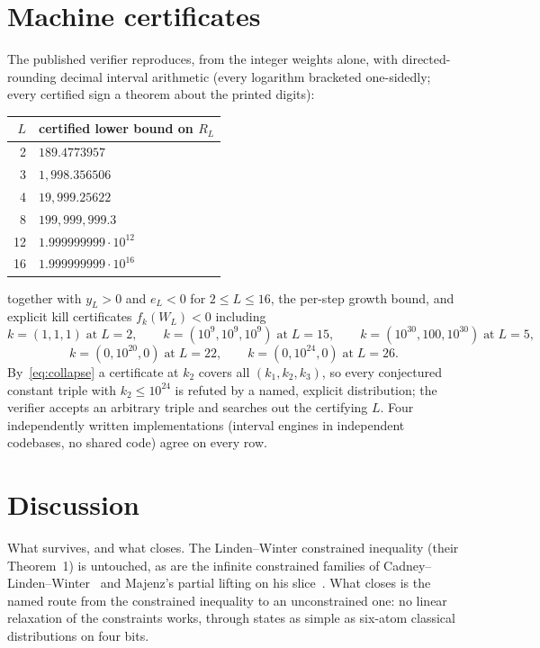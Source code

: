 \documentclass[11pt]{article}
\theoremstyle{remark}
\begin{document}
\section{Machine certificates}\label{sec:certificates}

The published verifier reproduces, from the integer weights alone, with directed-rounding
decimal interval arithmetic (every logarithm bracketed one-sidedly; every certified sign
a theorem about the printed digits):

\begin{center}
\begin{tabular}{rl}
\toprule
$L$ & certified lower bound on $R_L$ \\
\midrule
2 & $189.4773957$ \\
3 & $1{,}998.356506$ \\
4 & $19{,}999.25622$ \\
8 & $199{,}999{,}999.3$ \\
12 & $1.999999999\cdot 10^{12}$ \\
16 & $1.999999999\cdot 10^{16}$ \\
\bottomrule
\end{tabular}
\end{center}

\noindent together with $y_L>0$ and $e_L<0$ for $2\le L\le 16$, the per-step growth
bound, and explicit kill certificates $f_k(W_L)<0$ including
\[
k=(1,1,1)\;\text{at}\;L{=}2,\qquad
k=(10^{9},10^{9},10^{9})\;\text{at}\;L{=}15,\qquad
k=(10^{30},100,10^{30})\;\text{at}\;L{=}5,
\]
\[
k=(0,10^{20},0)\;\text{at}\;L{=}22,\qquad
k=(0,10^{24},0)\;\text{at}\;L{=}26 .
\]
By~\eqref{eq:collapse} a certificate at $k_2$ covers all $(k_1,k_2,k_3)$, so every
conjectured constant triple with $k_2\le 10^{24}$ is refuted by a named, explicit
distribution; the verifier accepts an arbitrary triple and searches out the certifying
$L$. Four independently written implementations (interval engines in
independent codebases, no shared code) agree on every row.

\section{Discussion}

What survives, and what closes. The Linden--Winter constrained inequality (their
Theorem~1) is untouched, as are the infinite constrained families of
Cadney--Linden--Winter~\cite{CLW2012} and Majenz's partial lifting on his
slice~\cite{Majenz2018}. What closes is the named route from the constrained inequality
to an unconstrained one: no linear relaxation of the constraints works, through states as
simple as six-atom classical distributions on four bits.
\end{document}
